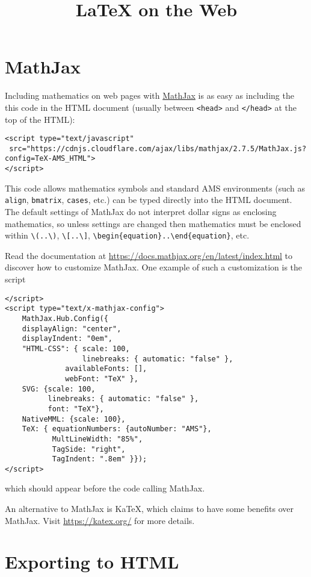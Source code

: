 \documentclass{article}
\title{\Huge \LaTeX{} on the Web}
\date{}
\begin{document}
\maketitle

\section{MathJax}

Including mathematics on web pages
with \href{https://www.mathjax.org/}{MathJax} is as easy as including the this
code in the HTML document (usually between \verb~<head>~ and \verb~</head>~ at
the top of the HTML):
\begin{lstlisting}
<script type="text/javascript"
 src="https://cdnjs.cloudflare.com/ajax/libs/mathjax/2.7.5/MathJax.js?config=TeX-AMS_HTML">
</script>
\end{lstlisting}
This code allows mathematics symbols and standard AMS environments (such as
\verb~align~, \verb~bmatrix~, \verb~cases~, etc.) can be typed directly into
the HTML document.  The default settings of MathJax do not interpret dollar
signs as enclosing mathematics, so unless settings are changed then mathematics
must be enclosed within \verb~\(..\)~, \verb~\[..\]~,
\verb~\begin{equation}..\end{equation}~, etc.

Read the documentation at \url{https://docs.mathjax.org/en/latest/index.html}
to discover how to customize MathJax.  One example of such a customization is
the script
\begin{lstlisting}
</script>
<script type="text/x-mathjax-config">
    MathJax.Hub.Config({
	displayAlign: "center",
	displayIndent: "0em",
	"HTML-CSS": { scale: 100,
	              linebreaks: { automatic: "false" },
		      availableFonts: [],
		      webFont: "TeX" },
	SVG: {scale: 100,
	      linebreaks: { automatic: "false" },
	      font: "TeX"},
	NativeMML: {scale: 100},
	TeX: { equationNumbers: {autoNumber: "AMS"},
	       MultLineWidth: "85%",
	       TagSide: "right",
	       TagIndent: ".8em" }});
</script>
\end{lstlisting}
which should appear before the code calling MathJax.

An alternative to MathJax is KaTeX, which claims to have some benefits over
MathJax.  Visit \url{https://katex.org/} for more details.

\section{Exporting to HTML}
\end{document}
